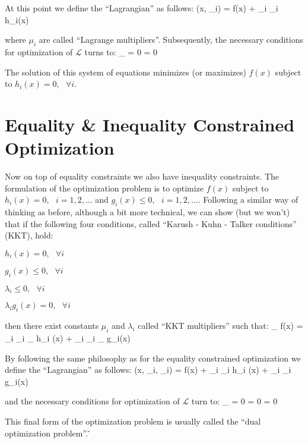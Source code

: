 At this point we define the ``Lagrangian'' as follows:
\bse
{}(x, \mu_{i}) = f(x) + \sum_{i} \mu_{i} h_{i}(x)
\ese

where $\mu_{i}$ are called ``Lagrange multipliers''. Subsequently, the necessary conditions for optimization of $
\mathcal{L}$ turns to:
\bse
\nabla_{}  = 0 \:\:\:  \:\:\:  = 0
\ese

The solution of this system of equations minimizes (or maximizes) $f(x)$ subject to $h_{i}(x) = 0, \:\:\: \forall i$.

\section{Equality \& Inequality Constrained Optimization}

Now on top of equality constraints we also have inequality constraints. The formulation of the optimization problem
is to optimize $f(x)$ subject to $h_{i}(x) = 0, \:\:\: i=1,2,\ldots$ and $g_{i}(x) \leq 0, \:\:\: i=1,2,\ldots$.
Following a similar way of thinking as before, although a bit more technical, we can show (but we won't) that if the
following four conditions, called ``Karush - Kuhn - Talker conditions'' (KKT), hold:
\bit
\item $h_{i}(x) = 0, \:\:\: \forall i$
\item $g_{i}(x) \leq 0, \:\:\: \forall i$
\item $\lambda_{i} \leq 0, \:\:\: \forall i$
\item $\lambda_{i} g_{i}(x) = 0, \:\:\: \forall i$
\eit

then there exist constants $\mu_{i}$ and $\lambda_{i}$ called ``KKT multipliers'' such that:
\bse
\nabla_{} f(x) =
\sum_{i} \mu_{i} \nabla_{} h_{i} (x) + \sum_{i} \lambda_{i} \nabla_{} g_{i}(x)
\ese

By following the same philosophy as for the equality constrained optimization we define the ``Lagrangian'' as follows:
\bse
{}(x, \mu_{i}, \lambda_{i}) = f(x) + \sum_{i} \mu_{i} h_{i} (x) + \sum_{i} \lambda_{i} g_{i}(x)
\ese

and the necessary conditions for optimization of $ \mathcal{L}$ turn to:
\bse
\nabla_{} 
= 0 \:\:\:  \:\:\: 
= 0 \:\:\:  \:\:\: 
= 0
\ese

This final form of the optimization problem is usually called the ``dual optimization problem''. \v

